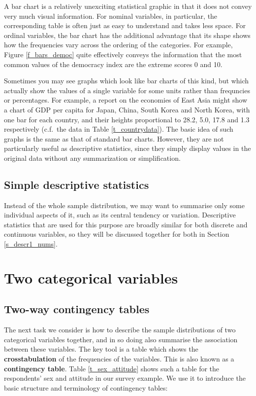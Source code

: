 A bar chart is a relatively unexciting statistical graphic in that it
does not convey very much visual information. For nominal variables, in
particular, the corresponding table is often just as easy to understand
and takes less space. For ordinal variables, the bar chart has the
additional advantage that its shape shows how the frequencies vary
across the ordering of the categories. For example, Figure
\ref{f_bars_democ} quite effectively conveys the information that the
most common values of the democracy index are the extreme scores 0 and
10.

Sometimes you may see graphs which look like bar charts of this kind,
but which actually show the values of a single variable for some
units rather than frequncies or percentages. For example, a report on
the economies of East Asia might show a chart of GDP per capita for
Japan, China, South Korea and North Korea, with one bar for each
country, and their heights proportional to 28.2, 5.0, 17.8 and 1.3
respectively (c.f.\ the data in Table \ref{t_countrydata}). The basic
idea of such graphs is the same as that of standard bar charts. However,
they are not particularly useful as descriptive statistics, since they
simply display values in the original data without any summarization or
simplification.

\subsection{Simple descriptive statistics}
\label{ss_descr1_1cat_descriptives}

Instead of the whole sample distribution, we may want to summarise only
some individual aspects of it, such as its central tendency or
variation. Descriptive statistics that are used for this purpose are
broadly similar for both discrete and continuous variables, so they will
be discussed together for both in Section \ref{s_descr1_nums}.

\section{Two categorical variables}
\label{s_descr1_2cat}

\subsection{Two-way contingency tables}
\label{ss_descr1_2cat_tables}

The next task we consider is how to describe the sample distributions of
two categorical variables together, and in so doing also summarise the
association between these variables. The key tool is a table which shows
the \textbf{crosstabulation} of the frequencies of the variables. This
is also known as a \textbf{contingency table}. Table
\ref{t_sex_attitude} shows such a table for the respondents' sex and
attitude in our survey example. We use it to introduce the basic
structure and terminology of contingency tables:

